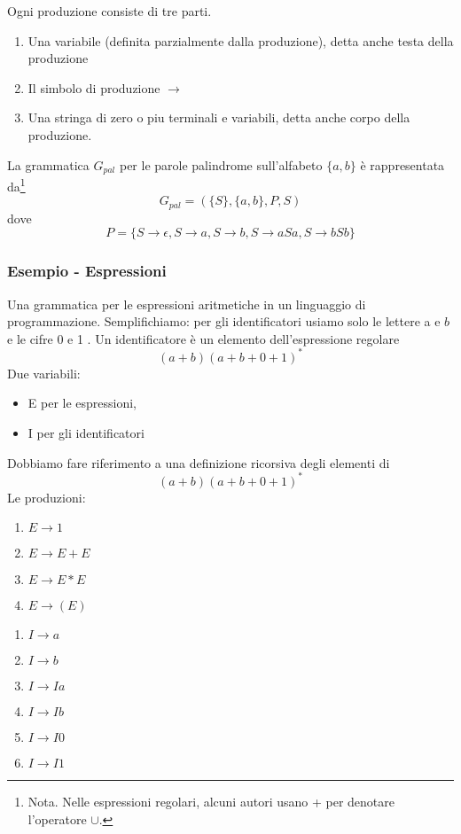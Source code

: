 Ogni produzione consiste di tre parti.
\begin{enumerate}
    \item Una variabile (definita parzialmente dalla produzione), detta anche testa della produzione
    \item Il simbolo di produzione $\rightarrow$
    \item Una stringa di zero o piu terminali e variabili, detta anche corpo della produzione.
\end{enumerate}
La grammatica $G_{p a l}$ per le parole palindrome sull'alfabeto $\{a, b\}$ è rappresentata da\footnote{Nota. Nelle espressioni regolari, alcuni autori usano + per denotare l’operatore $\cup$.}
$$
G_{p a l}=(\{S\},\{a, b\}, P, S)
$$
dove
$$
P=\{S \rightarrow \epsilon, S \rightarrow a, S \rightarrow b, S \rightarrow a S a, S \rightarrow b S b\}
$$

\subsubsection{Esempio - Espressioni}
Una grammatica per le espressioni aritmetiche in un linguaggio di programmazione.
Semplifichiamo: per gli identificatori usiamo solo le lettere a e $b$ e le cifre 0 e 1 .
Un identificatore è un elemento dell'espressione regolare
$$
(a+b)(a+b+0+1)^{*}
$$
Due variabili:
\begin{itemize}
    \item E per le espressioni,
    \item I per gli identificatori
\end{itemize}
Dobbiamo fare riferimento a una definizione ricorsiva degli elementi di
$$
(a+b)(a+b+0+1)^{*}
$$
Le produzioni:
\begin{enumerate}
    \item $E \rightarrow 1$
    \item $E \rightarrow E+E$
    \item $E \rightarrow E * E$
    \item $E \rightarrow(E)$
\end{enumerate}

\vspace{5mm}

\begin{enumerate}
    \item $I \rightarrow a$
    \item $I \rightarrow b$
    \item $I \rightarrow Ia$
    \item $I \rightarrow Ib$
    \item $I \rightarrow I0$
    \item $I \rightarrow I1$
\end{enumerate}

